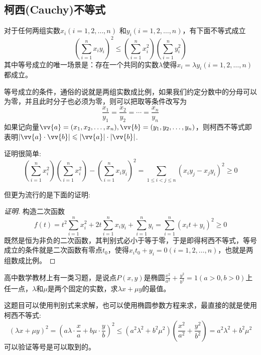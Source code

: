 \subsection{柯西(Cauchy)不等式}

\begin{theorem}[柯西不等式]
  对于任何两组实数$x_i(i=1,2,\ldots,n)$ 和$y_i(i=1,2,\ldots,n)$，有下面不等式成立
  \begin{equation}
    \label{eq:cauchy-inequation}
    \left( \sum_{i=1}^nx_iy_i \right)^{2} \leqslant \left( \sum_{i=1}^{n}x_i^2 \right) \left( \sum_{i=1}^ny_i^{2} \right)
  \end{equation}
  其中等号成立的唯一场景是：存在一个共同的实数$\lambda$使得$x_i=\lambda y_{i}(i=1,2,\ldots,n)$都成立。
\end{theorem}
等号成立的条件，通俗的说就是两组实数成比例，如果我们约定分数中的分母可以为零，并且此时分子也必须为零，则可以把取等条件改写为
\begin{equation*}
  \frac{x_1}{y_1} = \frac{x_2}{y_2} = \cdots = \frac{x_n}{y_n}
\end{equation*}
如果记向量$\vv{a}=(x_1,x_2,\ldots,x_n), \vv{b}=(y_1,y_2,\ldots,y_n)$，则柯西不等式即表明$|\vv{a} \cdot \vv{b}| \leqslant |\vv{a}| \cdot |\vv{b}|$.

证明很简单:
\begin{equation*}
  \left( \sum_{i=1}^nx_i^2 \right) \left( \sum_{i=1}^nx_i^2 \right) - \left( \sum_{i=1}^nx_iy_i \right)^2 = \sum_{1 \leqslant i < j \leqslant n}(x_iy_j-x_jy_i)^2 \geqslant 0
\end{equation*}

但更为流行的是下面的证明:

\begin{proof}[证明]
  构造二次函数
  \begin{equation*}
  f(t)=t^2\sum_{i=1}^nx_i^2+2t\sum_{i=1}^nx_iy_i+\sum_{i=1}^ny_i=\sum_{i=1}^n(x_it+y_i)^2 \geqslant 0
  \end{equation*}
 既然是恒为非负的二次函数，其判别式必小于等于零，于是即得柯西不等式，等号成立的条件就是二次函数有零点$t_0$，使得$x_it_0+y_i=0(i=1,2,\ldots,n)$，也就是两组数成比例。
\end{proof}

\begin{example}
  高中数学教材上有一类习题，是说点$P(x,y)$是椭圆$\frac{x^2}{a^2}+\frac{y^2}{b^2}=1(a>0, b>0)$上任一点，$\lambda$和$\mu$是两个固定的实数，求$\lambda x + \mu y$的最值。

  这题目可以使用判别式来求解，也可以使用椭圆参数方程来求，最直接的就是使用柯西不等式:
  \begin{equation*}
    (\lambda x + \mu y)^2 = (a\lambda \cdot \frac{x}{a} + b\mu \cdot \frac{y}{b})^2 \leqslant (a^2\lambda^2+b^2\mu^2)(\frac{x^2}{a^2}+\frac{y^2}{b^2}) = a^2\lambda^2+b^2\mu^2
  \end{equation*}
  可以验证等号是可以取到的。
\end{example}

